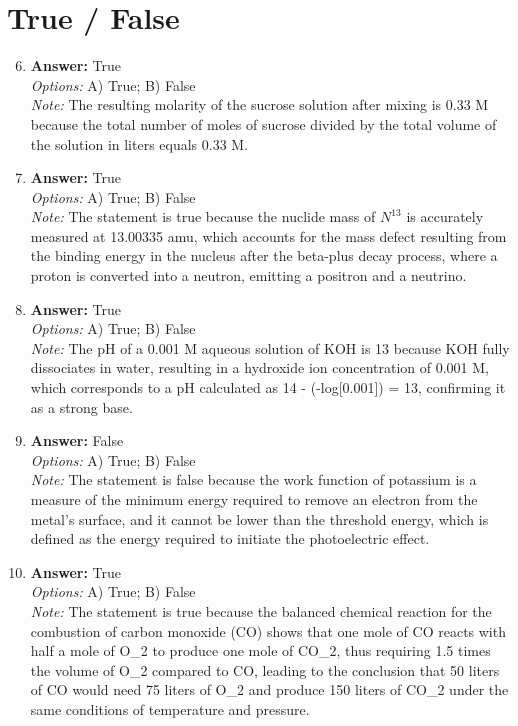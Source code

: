\documentclass[12pt]{article}
\begin{document}
\section*{True / False}
\begin{enumerate}[label=\arabic*.]
\setcounter{enumi}{5}
\item \textbf{Answer:} True
\\ \textit{Options:} A) True; B) False
\\ \textit{Note:} The resulting molarity of the sucrose solution after mixing is 0.33 M because the total number of moles of sucrose divided by the total volume of the solution in liters equals 0.33 M.
\item \textbf{Answer:} True
\\ \textit{Options:} A) True; B) False
\\ \textit{Note:} The statement is true because the nuclide mass of $N^13$ is accurately measured at 13.00335 amu, which accounts for the mass defect resulting from the binding energy in the nucleus after the beta-plus decay process, where a proton is converted into a neutron, emitting a positron and a neutrino.
\item \textbf{Answer:} True
\\ \textit{Options:} A) True; B) False
\\ \textit{Note:} The pH of a 0.001 M aqueous solution of KOH is 13 because KOH fully dissociates in water, resulting in a hydroxide ion concentration of 0.001 M, which corresponds to a pH calculated as 14 - (-log[0.001]) = 13, confirming it as a strong base.
\item \textbf{Answer:} False
\\ \textit{Options:} A) True; B) False
\\ \textit{Note:} The statement is false because the work function of potassium is a measure of the minimum energy required to remove an electron from the metal's surface, and it cannot be lower than the threshold energy, which is defined as the energy required to initiate the photoelectric effect.
\item \textbf{Answer:} True
\\ \textit{Options:} A) True; B) False
\\ \textit{Note:} The statement is true because the balanced chemical reaction for the combustion of carbon monoxide (CO) shows that one mole of CO reacts with half a mole of O\_2 to produce one mole of CO\_2, thus requiring 1.5 times the volume of O\_2 compared to CO, leading to the conclusion that 50 liters of CO would need 75 liters of O\_2 and produce 150 liters of CO\_2 under the same conditions of temperature and pressure.
\end{enumerate}
\end{document}
